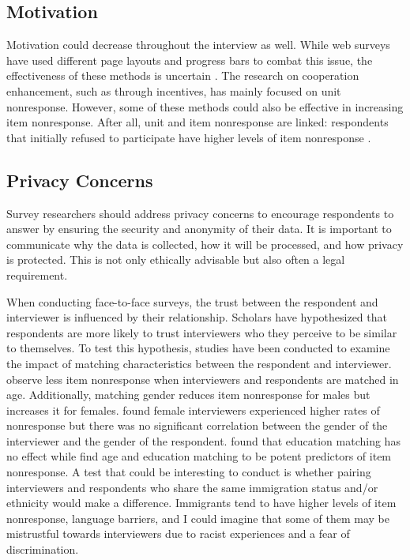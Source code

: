 \documentclass[a4paper,12pt]{article}
\begin{document}
\subsection{Motivation}

Motivation could decrease throughout the interview as well. While web surveys have used different page layouts and progress bars to combat this issue, the effectiveness of these methods is uncertain \citep{peytchevWebSurveyDesign2006, yanShouldStayShould2011, sarrafSurveyPageLength2014}. The research on cooperation enhancement, such as through incentives, has mainly focused on unit nonresponse. However, some of these methods could also be effective in increasing item nonresponse. After all, unit and item nonresponse are linked: respondents that initially refused to participate have higher levels of item nonresponse \citep{yanRelationUnitNonresponse2010, frickerExaminingRelationshipNonresponse2010}.

\subsection{Privacy Concerns}

Survey researchers should address privacy concerns to encourage respondents to answer by ensuring the security and anonymity of their data. It is important to communicate why the data is collected, how it will be processed, and how privacy is protected. This is not only ethically advisable but also often a legal requirement.

When conducting face-to-face surveys, the trust between the respondent and interviewer is influenced by their relationship. Scholars have hypothesized that respondents are more likely to trust interviewers who they perceive to be similar to themselves. To test this hypothesis, studies have been conducted to examine the impact of matching characteristics between the respondent and interviewer. \citet{vercruyssenEffectSociodemographicMis2017} observe less item nonresponse when interviewers and respondents are matched in age. Additionally, matching gender reduces item nonresponse for males but increases it for females. \citet{piekutSurveyNonresponseAttitudes2021} found female interviewers experienced higher rates of nonresponse but there was no significant correlation between the gender of the interviewer and the gender of the respondent. \citet{silberEffectsQuestionRespondent2021} found that education matching has no effect while \citet{tuSocialDistanceRespondent2007} find age and education matching to be potent predictors of item nonresponse. A test that could be interesting to conduct is whether pairing interviewers and respondents who share the same immigration status and/or ethnicity would make a difference. Immigrants tend to have higher levels of item nonresponse, language barriers, and I could imagine that some of them may be mistrustful towards interviewers due to racist experiences and a fear of discrimination.
\end{document}
